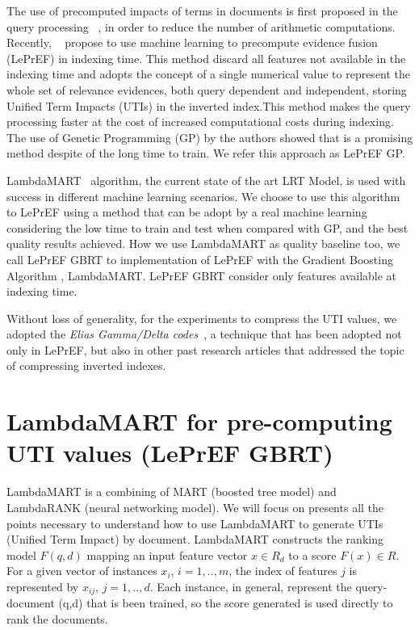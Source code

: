\documentclass[preprint,12pt,3p]{elsarticle}
\begin{document}
The use of precomputed impacts of terms in documents is first proposed in the query processing ~\cite{Anh:2002:ITE:564376.564380,Anh:2005:SSS:1076034.1076075,anh2008term}, in order to reduce the number of arithmetic computations. Recently, ~\cite{costa2012lepref} propose to use machine learning to precompute evidence fusion (LePrEF) in indexing time. This method discard all features not available in the indexing time and adopts the concept of a single numerical value to represent the whole set of relevance evidences, both query dependent and independent, storing  Unified Term Impacts (UTIs) in the inverted index.This method makes the query processing faster at the cost of increased computational costs during indexing. The use of Genetic Programming (GP) by the authors showed that is a promising method despite of the long time to train. We refer this approach as LePrEF GP. 

LambdaMART~\cite{wu2010lambdamart} algorithm, the current state of the art LRT Model, is used with success in different machine learning scenarios. We choose to use this algorithm to LePrEF using a method that can be adopt by a real machine learning considering the low time to train and test when compared  with GP, and the best quality results achieved. How we use LambdaMART as quality baseline too, we call LePrEF GBRT to implementation of LePrEF with the Gradient Boosting Algorithm , LambdaMART. LePrEF GBRT consider only features available at indexing time. 


Without loss of generality, for the experiments to compress the UTI values, we adopted the \textit{Elias Gamma/Delta codes}~\cite{elias1975universal}, a technique that has been adopted not only in LePrEF, but also in other past research articles that addressed the topic of compressing inverted indexes. 

\section{LambdaMART for pre-computing UTI values (LePrEF GBRT)}
\label{lambda}

LambdaMART \cite{wu2010lambdamart} is a combining of MART (boosted tree model) and LambdaRANK (neural networking model). We will focus on presents all the points necessary to understand how to use LambdaMART to generate UTIs (Unified Term Impact) by document. LambdaMART constructs the ranking model $F(q,d)$ mapping an input feature vector $x \in R_d$ to a score $F(x) \in R$. For a given vector of instances $x_i$, $i=1,..,m$, the index of features $j$ is represented by $x_{ij}$, $j=1,..,d$. Each instance, in general, represent the query-document (q,d) that is been trained, so the score generated is used directly to rank the documents.
 
\end{document}
